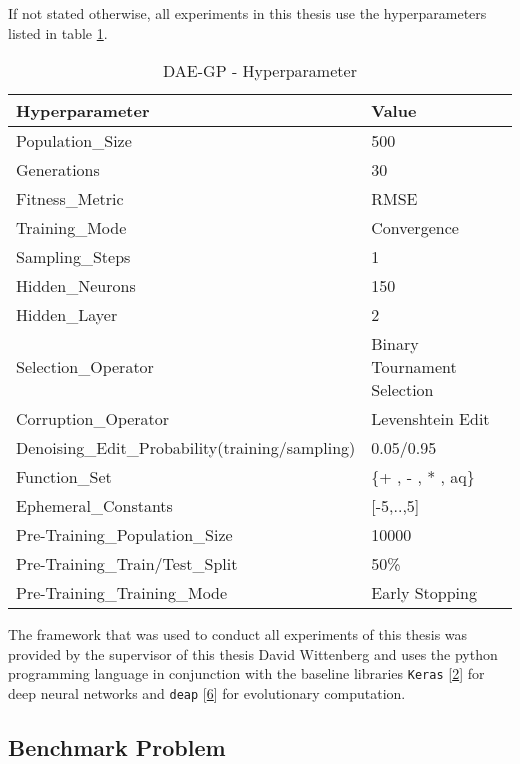 \documentclass[
  11pt,
]{article}
\begin{document}
If not stated otherwise, all experiments in this thesis use the hyperparameters listed in table \ref{tab:airfoil-fullRun-2hl-maxIndSize-params}.

\begin{table}

\caption{\label{tab:airfoil-fullRun-2hl-maxIndSize-params}DAE-GP - Hyperparameter}
\centering
\begin{tabular}[t]{l|l}
\hline
\textbf{Hyperparameter} & \textbf{Value}\\
\hline
Population\_Size & 500\\
\hline
Generations & 30\\
\hline
Fitness\_Metric & RMSE\\
\hline
Training\_Mode & Convergence\\
\hline
Sampling\_Steps & 1\\
\hline
Hidden\_Neurons & 150\\
\hline
Hidden\_Layer & 2\\
\hline
Selection\_Operator & Binary Tournament Selection\\
\hline
Corruption\_Operator & Levenshtein Edit\\
\hline
Denoising\_Edit\_Probability(training/sampling) & 0.05/0.95\\
\hline
Function\_Set & \{+ , - , * , aq\}\\
\hline
Ephemeral\_Constants & [-5,..,5]\\
\hline
Pre-Training\_Population\_Size & 10000\\
\hline
Pre-Training\_Train/Test\_Split & 50\%\\
\hline
Pre-Training\_Training\_Mode & Early Stopping\\
\hline
\end{tabular}
\end{table}

The framework that was used to conduct all experiments of this thesis was provided by the supervisor of this thesis David Wittenberg and uses the python programming language in conjunction with the baseline libraries \texttt{Keras} {[}\protect\hyperlink{ref-chollet2015keras}{2}{]} for deep neural networks and \texttt{deap} {[}\protect\hyperlink{ref-DEAP_JMLR2012}{6}{]} for evolutionary computation.

\hypertarget{benchmark-problem}{%
\subsection{Benchmark Problem}\label{benchmark-problem}}
\end{document}
